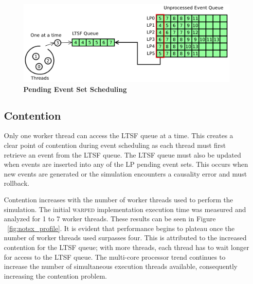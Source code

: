 \documentclass[11pt]{book}
\begin{document}
\begin{figure}[H]
    \centering
    \graphicspath{ {./figures/} }
    \includegraphics[width=\textwidth,height=\textheight,keepaspectratio]{single_ltsf_queue}
    \caption{\textbf{Pending Event Set Scheduling}}
    \label{fig:singleLTSFqueue}
\end{figure}

\subsection{Contention}

Only one worker thread can access the LTSF queue at a time.  This creates a clear point of
contention during event scheduling as each thread must first retrieve an event from the
LTSF queue.  The LTSF queue must also be updated when events are inserted into any of the
LP pending event sets.  This occurs when new events are generated or the simulation
encounters a causality error and must rollback.

Contention increases with the number of worker threads used to perform the simulation.
The initial \textsc{warped} implementation execution time was measured and analyzed for 1 to 7
worker threads.  These results can be seen in Figure ~\ref{fig:notsx_profile}.  It is
evident that performance begins to plateau once the number of worker threads used
surpasses four.  This is attributed to the increased contention for the LTSF queue; with
more threads, each thread has to wait longer for access to the LTSF queue.  The multi-core
processor trend continues to increase the number of simultaneous execution threads
available, consequently increasing the contention problem.
\end{document}
